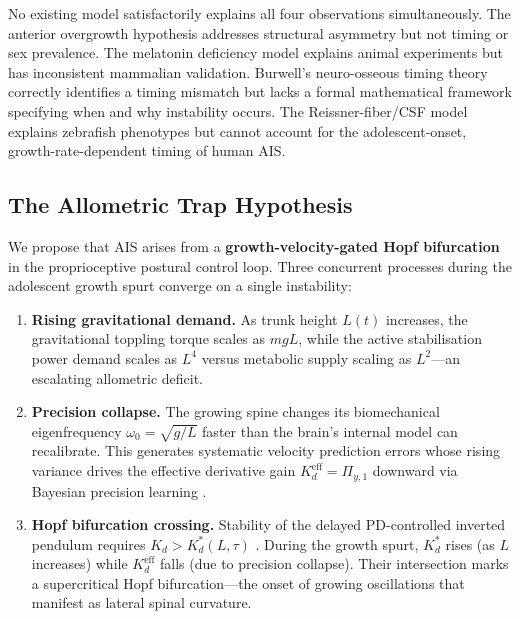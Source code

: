\documentclass[12pt, letterpaper]{article}
\newcommand{\Kd}{K_d}
\newcommand{\Kdcrit}{K_d^{*}}
\newcommand{\Kdeff}{K_d^{\mathrm{eff}}}
\newcommand{\Piy}{\Pi_{y,1}}
\begin{document}
No existing model satisfactorily explains all four observations simultaneously.
The anterior overgrowth hypothesis \citep{Castelein2005} addresses structural
asymmetry but not timing or sex prevalence. The melatonin deficiency model
\citep{Machida1993} explains animal experiments but has inconsistent mammalian
validation. Burwell's neuro-osseous timing theory \citep{Burwell2009} correctly
identifies a timing mismatch but lacks a formal mathematical framework specifying
when and why instability occurs. The Reissner-fiber/CSF model
\citep{CantautBelarif2018, Troutwine2020} explains zebrafish phenotypes but
cannot account for the adolescent-onset, growth-rate-dependent timing of human AIS.

\subsection{The Allometric Trap Hypothesis}

We propose that AIS arises from a \textbf{growth-velocity-gated Hopf bifurcation}
in the proprioceptive postural control loop. Three concurrent processes during
the adolescent growth spurt converge on a single instability:

\begin{enumerate}[label=\arabic*.]
  \item \textbf{Rising gravitational demand.} As trunk height $L(t)$ increases,
    the gravitational toppling torque scales as $mgL$, while the active
    stabilisation power demand scales as $L^{4}$ versus metabolic supply scaling
    as $L^{2}$---an escalating allometric deficit.

  \item \textbf{Precision collapse.} The growing spine changes its biomechanical
    eigenfrequency $\omega_0 = \sqrt{g/L}$ faster than the brain's internal
    model can recalibrate. This generates systematic velocity prediction errors
    whose rising variance drives the effective derivative gain
    $\Kdeff = \Piy$ downward via Bayesian precision learning \citep{Mathys2011}.

  \item \textbf{Hopf bifurcation crossing.} Stability of the delayed PD-controlled
    inverted pendulum requires $\Kd > \Kdcrit(L, \tau)$ \citep{Insperger2011}.
    During the growth spurt, $\Kdcrit$ rises (as $L$ increases) while $\Kdeff$
    falls (due to precision collapse). Their intersection marks a supercritical
    Hopf bifurcation---the onset of growing oscillations that manifest as lateral
    spinal curvature.
\end{enumerate}
\end{document}
